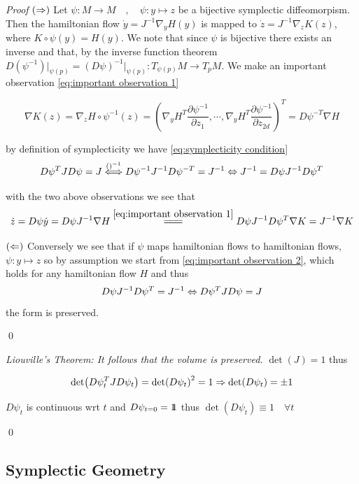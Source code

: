 \documentclass[12pt]{article}
\begin{document}
\textit{Proof} $(\Rightarrow)$ Let $\psi : M \to M \quad,\quad \psi : y\mapsto z$ be a bijective symplectic diffeomorpism. Then the hamiltonian flow $\dot y = J^{-1}\nabla_y H(y)$ is mapped to $\dot z = J^{-1}\nabla_z K(z)$, where $K \circ \psi(y) = H(y)$. We note that since $\psi$ is bijective there exists an inverse and that, by the inverse function theorem $D(\psi^{-1})\Big|_{\psi(p)} = (D\psi)^{-1}\Big|_{\psi(p)} : T_{\psi(p)}M \to T_pM$. We make an important observation \eqref{eq:important observation 1}

\begin{equation}\label{eq:important observation 1}
    \nabla K(z) = \nabla_z H\circ \psi^{-1}(z) = \left(\nabla_y H^T \frac{\partial \psi^{-1}}{\partial z_1},\cdots , \nabla_yH^T \frac{\partial \psi^{-1}}{\partial z_{2d}}\right)^T = D\psi^{-T} \nabla H
\end{equation}

by definition of symplecticity we have \eqref{eq:symplecticity condition}
\begin{equation}\label{eq:symplecticity condition}
    D\psi^TJD\psi = J \stackrel{()^{-1}}{\Longleftrightarrow} D\psi^{-1}J^{-1}D\psi^{-T} = J^{-1} \Leftrightarrow J^{-1} = D\psi J^{-1} D\psi^T
\end{equation}

with the two above observations we see that 
\begin{equation}\label{eq:important observation 2}
    \dot z = D\psi \dot y = D\psi J^{-1}\nabla H \overset{\eqref{eq:important observation 1}}{\longlongeq} D\psi J^{-1} D\psi^T \nabla K = J^{-1}\nabla K
\end{equation}

$(\Leftarrow)$ Conversely we see that if $\psi$ maps hamiltonian flows to hamiltonian flows, $\psi : y\mapsto z$ so by assumption we start from \eqref{eq:important observation 2}, which holds for any hamiltonian flow $H$ and thus
$$D\psi J^{-1}D\psi^T = J^{-1} \Leftrightarrow D\psi^T JD\psi = J$$
the form is preserved.

\qed

 \textit{Liouville's Theorem: It follows that the volume is preserved.} $\det(J) = 1$ thus

$$
\det(D\psi_t^TJD\psi_t) = \det(D\psi_t)^2 = 1 \Rightarrow \det(D\psi_t)=\pm 1
$$

$D\psi_t$ is continuous wrt $t$ and $D\psi_{t=0}=1\!\!1$ thus $\det (D\psi_t)\equiv 1\quad\forall t$

\qed

\subsection{Symplectic Geometry}
\end{document}
